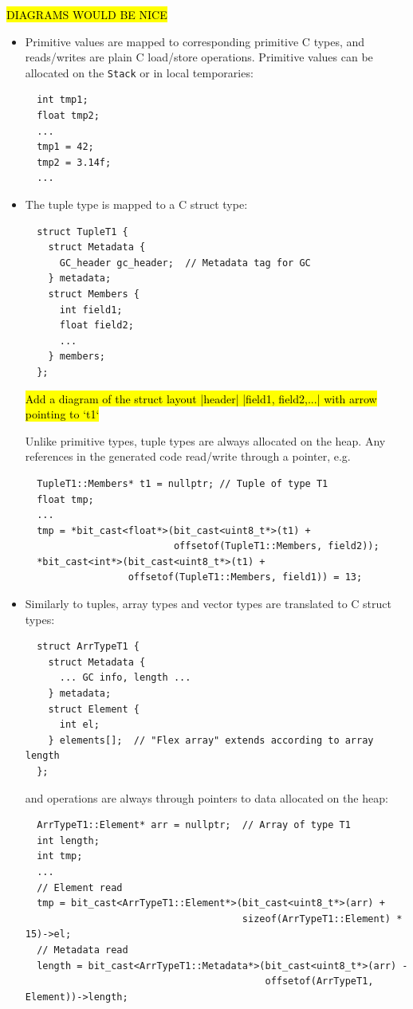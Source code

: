 \documentclass[leqno,11pt]{article}
\begin{document}
\hl{DIAGRAMS WOULD BE NICE}
\begin{itemize}
\item Primitive values are mapped to corresponding primitive C types, and
  reads/writes are plain C load/store operations. Primitive values can be
  allocated on the \texttt{Stack} or in local temporaries:
\begin{verbatim}
  int tmp1;
  float tmp2;
  ...
  tmp1 = 42;
  tmp2 = 3.14f;
  ...
\end{verbatim}

\item The tuple type is mapped to a C struct type:

\begin{verbatim}
  struct TupleT1 {
    struct Metadata {
      GC_header gc_header;  // Metadata tag for GC
    } metadata;
    struct Members {
      int field1;
      float field2;
      ...
    } members;
  };
\end{verbatim}

\hl{Add a diagram of the struct layout |header| |field1, field2,...| with arrow
  pointing to `t1`}

Unlike primitive types, tuple types are always allocated on the heap. Any
references in the generated code read/write through a pointer, e.g.
\begin{verbatim}
  TupleT1::Members* t1 = nullptr; // Tuple of type T1
  float tmp;
  ...
  tmp = *bit_cast<float*>(bit_cast<uint8_t*>(t1) +
                          offsetof(TupleT1::Members, field2));
  *bit_cast<int*>(bit_cast<uint8_t*>(t1) +
                  offsetof(TupleT1::Members, field1)) = 13;
\end{verbatim}

\item Similarly to tuples, array types and vector types are translated to C
  struct types:

\begin{verbatim}
  struct ArrTypeT1 {
    struct Metadata {
      ... GC info, length ...
    } metadata;
    struct Element {
      int el;
    } elements[];  // "Flex array" extends according to array length
  };
\end{verbatim}
and operations are always through pointers to data allocated on the heap:
\begin{verbatim}
  ArrTypeT1::Element* arr = nullptr;  // Array of type T1
  int length;
  int tmp;
  ...
  // Element read
  tmp = bit_cast<ArrTypeT1::Element*>(bit_cast<uint8_t*>(arr) +
                                      sizeof(ArrTypeT1::Element) * 15)->el;
  // Metadata read
  length = bit_cast<ArrTypeT1::Metadata*>(bit_cast<uint8_t*>(arr) -
                                          offsetof(ArrTypeT1, Element))->length;

\end{verbatim}

\end{itemize}
\end{document}
